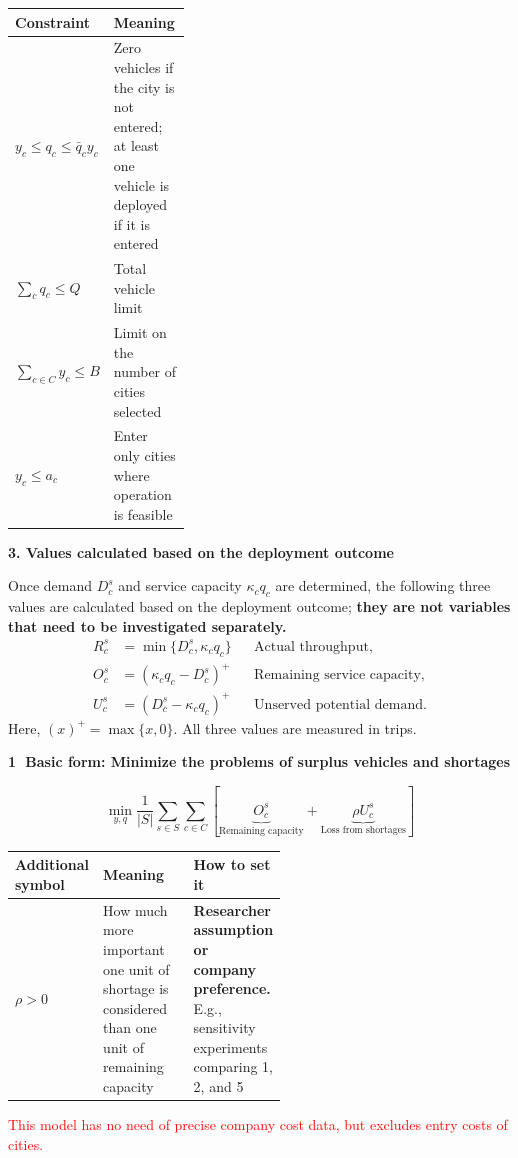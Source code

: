 \documentclass[10pt,a4paper]{article}
\newcommand{\hd}[1]{\par\vspace{8pt}\textbf{#1}\par\vspace{3pt}}
\newcommand{\circnum}[1]{\textcircled{\scriptsize #1}}
\newcommand{\red}[1]{\textcolor{red}{#1}}
\newcommand{\under}[2]{\underbrace{#1}_{\text{#2}}}
\begin{document}
{\small
\begin{tabularx}{\linewidth}{@{}>{\raggedright\arraybackslash}p{0.35\linewidth}Y@{}}
\toprule
Constraint & Meaning \\ \midrule
$y_c\le q_c\le\bar q_c y_c$ & Zero vehicles if the city is not entered; at least one vehicle is deployed if it is entered \\
$\sum_c q_c\le Q$ & Total vehicle limit \\
$\sum_{c\in C}y_c\le B$ & Limit on the number of cities selected \\
$y_c\le a_c$ & Enter only cities where operation is feasible \\
\bottomrule
\end{tabularx}
}

\hd{3. Values calculated based on the deployment outcome}
Once demand $D_c^s$ and service capacity $\kappa_c q_c$ are determined, the following three values are calculated based on the deployment outcome; \textbf{they are not variables that need to be investigated separately.}
\[
\begin{aligned}
R_c^s&=\min\{D_c^s,\kappa_c q_c\}&&\text{Actual throughput},\\
O_c^s&=(\kappa_c q_c-D_c^s)^+&&\text{Remaining service capacity},\\
U_c^s&=(D_c^s-\kappa_c q_c)^+&&\text{Unserved potential demand}.
\end{aligned}
\]
Here, $(x)^+=\max\{x,0\}$. All three values are measured in trips.

\hd{\circnum{1} Basic form: Minimize the problems of surplus vehicles and shortages}
\[
\boxed{\min_{y,q}\frac{1}{|S|}\sum_{s\in S}\sum_{c\in C}
\left[\under{O_c^s}{Remaining capacity}+\under{\rho U_c^s}{Loss from shortages}\right]}
\]

{\small
\begin{tabularx}{\linewidth}{@{}>{\raggedright\arraybackslash}p{0.14\linewidth}>{\raggedright\arraybackslash}p{0.4\linewidth}Y@{}}
\toprule
Additional symbol & Meaning & How to set it \\ \midrule
$\rho>0$ & How much more important one unit of shortage is considered than one unit of remaining capacity & \textbf{Researcher assumption or company preference.} E.g., sensitivity experiments comparing 1, 2, and 5 \\
\bottomrule
\end{tabularx}
}

\red{This model has no need of precise company cost data, but excludes entry costs of cities.}\\
\
\end{document}
